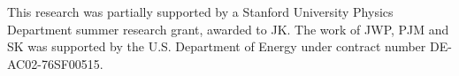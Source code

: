 This research was partially supported by a Stanford University Physics Department summer research grant, awarded to JK.
The work of JWP, PJM and SK was supported by the U.S. Department of Energy under contract number DE-AC02-76SF00515.
